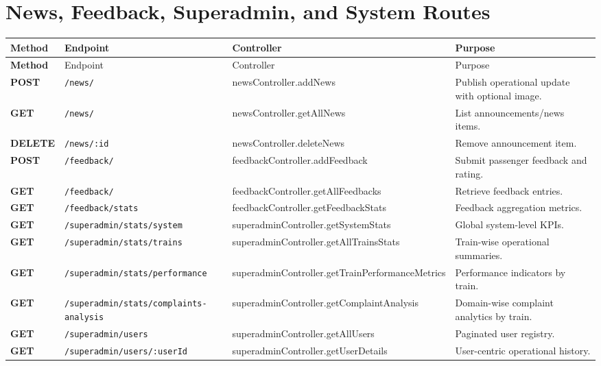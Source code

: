 \documentclass[12pt,a4paper]{report}
\begin{document}
\section{News, Feedback, Superadmin, and System Routes}
\begin{longtable}{>{\bfseries}p{} p{} p{} p{}}
\toprule
\rowcolor{TableHeader}
\textcolor{TableHeaderText}{Method} & \textcolor{TableHeaderText}{Endpoint} & \textcolor{TableHeaderText}{Controller} & \textcolor{TableHeaderText}{Purpose} \\
\midrule
\endfirsthead
\toprule
\rowcolor{TableHeader}
\textcolor{TableHeaderText}{Method} & \textcolor{TableHeaderText}{Endpoint} & \textcolor{TableHeaderText}{Controller} & \textcolor{TableHeaderText}{Purpose} \\
\midrule
\endhead
POST & \texttt{/news/} & newsController.addNews & Publish operational update with optional image. \\
GET & \texttt{/news/} & newsController.getAllNews & List announcements/news items. \\
DELETE & \texttt{/news/:id} & newsController.deleteNews & Remove announcement item. \\
POST & \texttt{/feedback/} & feedbackController.addFeedback & Submit passenger feedback and rating. \\
GET & \texttt{/feedback/} & feedbackController.getAllFeedbacks & Retrieve feedback entries. \\
GET & \texttt{/feedback/stats} & feedbackController.getFeedbackStats & Feedback aggregation metrics. \\
GET & \texttt{/superadmin/stats/system} & superadminController.getSystemStats & Global system-level KPIs. \\
GET & \texttt{/superadmin/stats/trains} & superadminController.getAllTrainsStats & Train-wise operational summaries. \\
GET & \texttt{/superadmin/stats/performance} & superadminController.getTrainPerformanceMetrics & Performance indicators by train. \\
GET & \texttt{/superadmin/stats/complaints-analysis} & superadminController.getComplaintAnalysis & Domain-wise complaint analytics by train. \\
GET & \texttt{/superadmin/users} & superadminController.getAllUsers & Paginated user registry. \\
GET & \texttt{/superadmin/users/:userId} & superadminController.getUserDetails & User-centric operational history. \\

\end{longtable}
\end{document}

